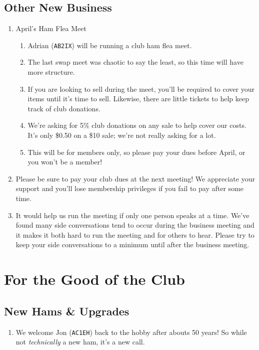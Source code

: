 \documentclass[10pt,letterpaper]{article}
\begin{document}
\subsection{Other New Business}
\begin{enumerate}
  \item April's Ham Flea Meet
  \begin{enumerate}
    \item Adrian (\texttt{AB2IX}) will be running a club ham flea meet.
    \item The last swap meet was chaotic to say the least, so this time will have more structure.
    \item If you are looking to sell during the meet, you'll be required to cover your items until it's time to sell. Likewise, there are little tickets to help keep track of club donations.
    \item We're asking for 5\% club donations on any sale to help cover our costs. It's only \$0.50 on a \$10 sale; we're not really asking for a lot.
    \item This will be for members only, so please pay your dues before April, or you won't be a member!
  \end{enumerate}
  \item Please be sure to pay your club dues at the next meeting! We appreciate your support and you'll lose membership privileges if you fail to pay after some time.
  \item It would help us run the meeting if only one person speaks at a time. We've found many side conversations tend to occur during the business meeting and it makes it both hard to run the meeting and for others to hear. Please try to keep your side conversations to a minimum until after the business meeting.
\end{enumerate}

\section{For the Good of the Club}

\subsection{New Hams \& Upgrades}
\begin{enumerate}
  \item We welcome Jon (\texttt{AC1EH}) back to the hobby after abouts 50 years! So while not \emph{technically} a new ham, it's a new call.
\end{enumerate}
\end{document}
